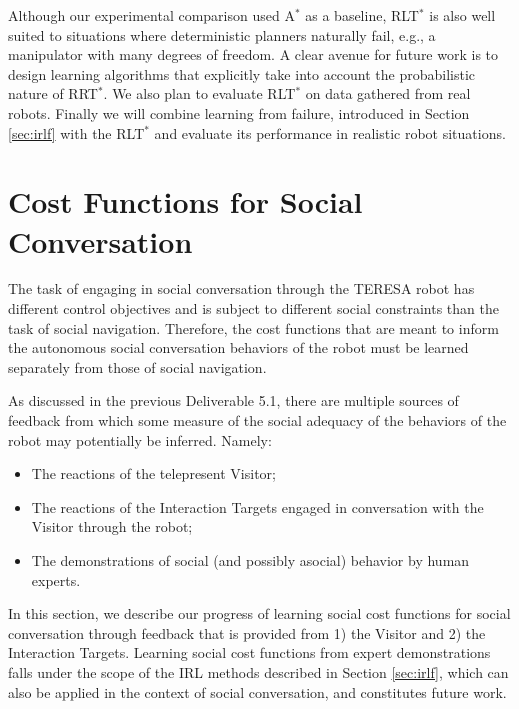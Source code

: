 \documentclass[a4paper,11pt]{report}
\begin{document}
 Although our experimental comparison used A$^*$ as a baseline, RLT$^*$ is also well suited to situations where deterministic planners naturally fail, e.g., a manipulator with many degrees of freedom. A clear avenue for future work is to design learning algorithms that explicitly take into account the probabilistic nature of RRT$^*$. We also plan to evaluate RLT$^*$ on data gathered from real robots. Finally we will combine learning from failure, introduced in Section \ref{sec:irlf} with the RLT$^*$ and evaluate its performance in realistic robot situations.

\clearpage

\section{Cost Functions for Social Conversation}
\label{sec:cost_functions}

The task of engaging in social conversation through the TERESA robot has different control objectives and is subject to different social constraints than the task of social navigation. Therefore, the cost functions that are meant to inform the autonomous social conversation behaviors of the robot must be learned separately from those of social navigation.

As discussed in the previous Deliverable 5.1, there are multiple sources of feedback from which some measure of the social adequacy of the behaviors of the robot may potentially be inferred. Namely:
\begin{itemize}
\item The reactions of the telepresent Visitor;
\item The reactions of the Interaction Targets engaged in conversation with the Visitor through the robot;
\item The demonstrations of social (and possibly asocial) behavior by human experts. 
\end{itemize}

In this section, we describe our progress of learning social cost functions for social conversation through feedback that is provided from 1) the Visitor and 2) the Interaction Targets. Learning social cost functions from expert demonstrations falls under the scope of the IRL methods described in Section \ref{sec:irlf}, which can also be applied in the context of social conversation, and constitutes future work.
\end{document}
